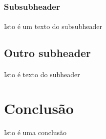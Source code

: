 \documentclass[letterpaper, 11pt]{article}
\begin{document}
\subsubsection{Subsubheader}
\label{sec:org75a2111}

\paragraph{}
Isto é um texto do subsubheader

\subsection{Outro subheader}
\label{sec:orga1da778}
\paragraph{}
Isto é texto do subheader

\clearpage
\section{Conclusão}
\label{sec:orge2d7fa3}

\paragraph{}
Isto é uma conclusão
\end{document}
